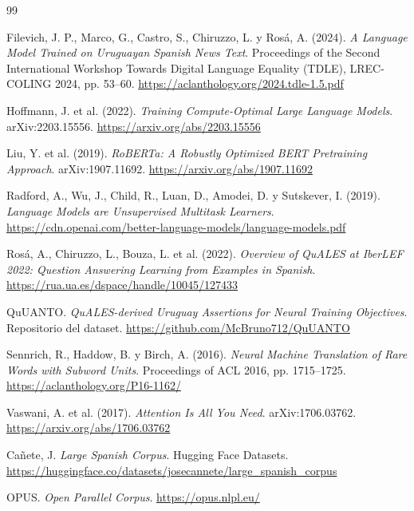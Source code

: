 \documentclass[11pt,a4paper]{article}
\begin{document}
\clearpage
\begin{thebibliography}{99}

Filevich, J. P., Marco, G., Castro, S., Chiruzzo, L. y Rosá, A. (2024).
\newblock \emph{A Language Model Trained on Uruguayan Spanish News Text}.
\newblock Proceedings of the Second International Workshop Towards Digital
Language Equality (TDLE), LREC-COLING 2024, pp. 53--60.
\newblock \url{https://aclanthology.org/2024.tdle-1.5.pdf}

Hoffmann, J. et al. (2022).
\newblock \emph{Training Compute-Optimal Large Language Models}.
\newblock arXiv:2203.15556.
\newblock \url{https://arxiv.org/abs/2203.15556}

Liu, Y. et al. (2019).
\newblock \emph{RoBERTa: A Robustly Optimized BERT Pretraining Approach}.
\newblock arXiv:1907.11692.
\newblock \url{https://arxiv.org/abs/1907.11692}

Radford, A., Wu, J., Child, R., Luan, D., Amodei, D. y Sutskever, I. (2019).
\newblock \emph{Language Models are Unsupervised Multitask Learners}.
\newblock \url{https://cdn.openai.com/better-language-models/language-models.pdf}

Rosá, A., Chiruzzo, L., Bouza, L. et al. (2022).
\newblock \emph{Overview of QuALES at IberLEF 2022: Question Answering
Learning from Examples in Spanish}.
\newblock \url{https://rua.ua.es/dspace/handle/10045/127433}

QuUANTO.
\newblock \emph{QuALES-derived Uruguay Assertions for Neural Training Objectives}.
\newblock Repositorio del dataset.
\newblock \url{https://github.com/McBruno712/QuUANTO}

Sennrich, R., Haddow, B. y Birch, A. (2016).
\newblock \emph{Neural Machine Translation of Rare Words with Subword Units}.
\newblock Proceedings of ACL 2016, pp. 1715--1725.
\newblock \url{https://aclanthology.org/P16-1162/}

Vaswani, A. et al. (2017).
\newblock \emph{Attention Is All You Need}.
\newblock arXiv:1706.03762.
\newblock \url{https://arxiv.org/abs/1706.03762}

Cañete, J.
\newblock \emph{Large Spanish Corpus}.
\newblock Hugging Face Datasets.
\newblock \url{https://huggingface.co/datasets/josecannete/large_spanish_corpus}

OPUS.
\newblock \emph{Open Parallel Corpus}.
\newblock \url{https://opus.nlpl.eu/}

\end{thebibliography}
\end{document}
